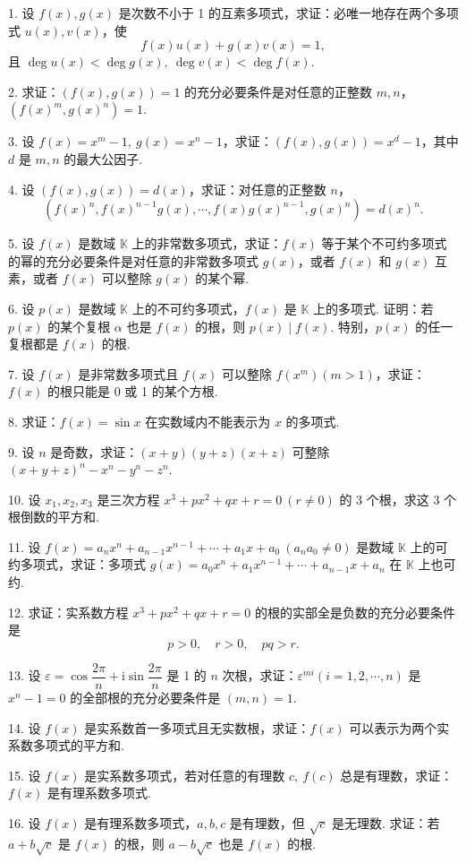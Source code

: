\documentclass[UTF8,12pt,a4paper,fontset=fandol]{ctexart}
\begin{document}
1. 设 $f(x),g(x)$ 是次数不小于 1 的互素多项式，求证：必唯一地存在两个多项式 $u(x),v(x)$，使
\[
f(x)u(x)+g(x)v(x)=1,
\]
且 $\deg u(x)<\deg g(x),\ \deg v(x)<\deg f(x)$.

2. 求证：$(f(x),g(x))=1$ 的充分必要条件是对任意的正整数 $m,n$，$(f(x)^m,g(x)^n)=1$.

3. 设 $f(x)=x^m-1,\ g(x)=x^n-1$，求证：$(f(x),g(x))=x^d-1$，其中 $d$ 是 $m,n$ 的最大公因子.

4. 设 $(f(x),g(x))=d(x)$，求证：对任意的正整数 $n$，
\[
(f(x)^n,f(x)^{n-1}g(x),\cdots,f(x)g(x)^{n-1},g(x)^n)=d(x)^n.
\]

5. 设 $f(x)$ 是数域 $\mathbb{K}$ 上的非常数多项式，求证：$f(x)$ 等于某个不可约多项式的幂的充分必要条件是对任意的非常数多项式 $g(x)$，或者 $f(x)$ 和 $g(x)$ 互素，或者 $f(x)$ 可以整除 $g(x)$ 的某个幂.

6. 设 $p(x)$ 是数域 $\mathbb{K}$ 上的不可约多项式，$f(x)$ 是 $\mathbb{K}$ 上的多项式. 证明：若 $p(x)$ 的某个复根 $\alpha$ 也是 $f(x)$ 的根，则 $p(x)\mid f(x)$. 特别，$p(x)$ 的任一复根都是 $f(x)$ 的根.

7. 设 $f(x)$ 是非常数多项式且 $f(x)$ 可以整除 $f(x^m)(m>1)$，求证：$f(x)$ 的根只能是 0 或 1 的某个方根.

8. 求证：$f(x)=\sin x$ 在实数域内不能表示为 $x$ 的多项式.

9. 设 $n$ 是奇数，求证：$(x+y)(y+z)(x+z)$ 可整除 $(x+y+z)^n-x^n-y^n-z^n$.

10. 设 $x_1,x_2,x_3$ 是三次方程 $x^3+px^2+qx+r=0\ (r\neq 0)$ 的 3 个根，求这 3 个根倒数的平方和.

11. 设 $f(x)=a_nx^n+a_{n-1}x^{n-1}+\cdots+a_1x+a_0\ (a_na_0\neq 0)$ 是数域 $\mathbb{K}$ 上的可约多项式，求证：多项式 $g(x)=a_0x^n+a_1x^{n-1}+\cdots+a_{n-1}x+a_n$ 在 $\mathbb{K}$ 上也可约.

12. 求证：实系数方程 $x^3+px^2+qx+r=0$ 的根的实部全是负数的充分必要条件是
\[
p>0,\quad r>0,\quad pq>r.
\]

13. 设 $\varepsilon=\cos\dfrac{2\pi}{n}+\mathrm{i}\sin\dfrac{2\pi}{n}$ 是 1 的 $n$ 次根，求证：$\varepsilon^{mi}(i=1,2,\cdots,n)$ 是 $x^n-1=0$ 的全部根的充分必要条件是 $(m,n)=1$.

14. 设 $f(x)$ 是实系数首一多项式且无实数根，求证：$f(x)$ 可以表示为两个实系数多项式的平方和.

15. 设 $f(x)$ 是实系数多项式，若对任意的有理数 $c,\ f(c)$ 总是有理数，求证：$f(x)$ 是有理系数多项式.

16. 设 $f(x)$ 是有理系数多项式，$a,b,c$ 是有理数，但 $\sqrt c$ 是无理数. 求证：若 $a+b\sqrt c$ 是 $f(x)$ 的根，则 $a-b\sqrt c$ 也是 $f(x)$ 的根.
\end{document}
